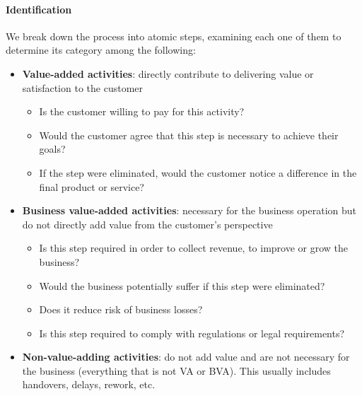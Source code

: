 \paragraph{Identification} We break down the process into atomic steps, 
examining each one of them to determine its category among the following:
\begin{itemize}
    \item \textbf{Value-added activities}: directly contribute to delivering value or satisfaction to the customer
        \begin{itemize}
            \item Is the customer willing to pay for this activity?
            \item Would the customer agree that this step is necessary to achieve their goals?
            \item If the step were eliminated, would the customer notice a difference in the final product or service?
        \end{itemize}
    \item \textbf{Business value-added activities}: necessary for the business operation but do not directly add value from the customer's perspective
        \begin{itemize}
            \item Is this step required in order to collect revenue, to improve or grow the business?
            \item Would the business potentially suffer if this step were eliminated?
            \item Does it reduce risk of business losses?
            \item Is this step required to comply with regulations or legal requirements?
        \end{itemize}
    \item \textbf{Non-value-adding activities}: do not add value and are not necessary for the business (everything that is not VA or BVA).
    This usually includes handovers, delays, rework, etc.
\end{itemize}

